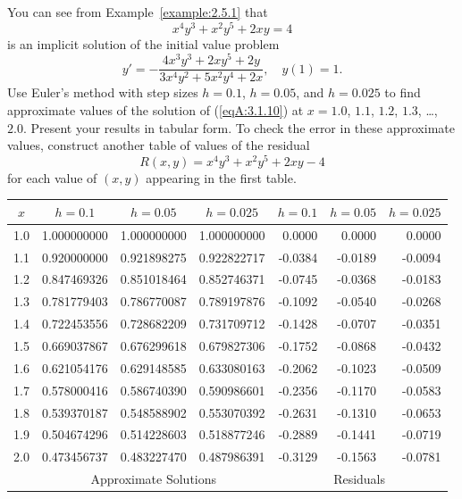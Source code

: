 \documentclass{ximera}
\begin{document}
\begin{problem}\label{exer:3.1.10} 
You can see from Example~\ref{example:2.5.1} that
$$
x^4y^3+x^2y^5+2xy=4
$$
is an implicit solution of the initial value problem
\begin{equation}\label{eqA:3.1.10}
y'=-\frac{4x^3y^3+2xy^5+2y}{3x^4y^2+5x^2y^4+2x},\quad y(1)=1.
\end{equation}
Use Euler's method with step sizes $h=0.1$, $h=0.05$, and $h=0.025$ to
find approximate values of the solution of (\ref{eqA:3.1.10}) at
$x=1.0$, $1.1$, $1.2$, $1.3$, \dots, $2.0$. Present your results in tabular form.
To check the error in these approximate values, construct another
table of values of the residual
$$
R(x,y)=x^4y^3+x^2y^5+2xy-4
$$
for each value of $(x,y)$ appearing in the first table.



\begin{solution}
    {\small
\begin{tabular}{|c|r|r|r|r|r|r|}\hline
\multicolumn{1}{|c|}{$x$}&
\multicolumn{1}{|c|}{$h=0.1$}&
\multicolumn{1}{|c|}{$h=0.05$}&
\multicolumn{1}{|c|}{$h=0.025$}&
\multicolumn{1}{|c|}{$h=0.1$}&
\multicolumn{1}{|c|}{$h=0.05$}&
\multicolumn{1}{|c|}{$h=0.025$}\\ \hline
1.0 & 1.000000000 & 1.000000000 & 1.000000000 & 0.0000 & 0.0000  &  0.0000  \\
1.1 & 0.920000000 & 0.921898275 & 0.922822717 &-0.0384 & -0.0189 & -0.0094  \\
1.2 & 0.847469326 & 0.851018464 & 0.852746371 &-0.0745 & -0.0368 & -0.0183  \\
1.3 & 0.781779403 & 0.786770087 & 0.789197876 &-0.1092 & -0.0540 & -0.0268  \\
1.4 & 0.722453556 & 0.728682209 & 0.731709712 &-0.1428 & -0.0707 & -0.0351  \\
1.5 & 0.669037867 & 0.676299618 & 0.679827306 &-0.1752 & -0.0868 & -0.0432  \\
1.6 & 0.621054176 & 0.629148585 & 0.633080163 &-0.2062 & -0.1023 & -0.0509  \\
1.7 & 0.578000416 & 0.586740390 & 0.590986601 &-0.2356 & -0.1170 & -0.0583  \\
1.8 & 0.539370187 & 0.548588902 & 0.553070392 &-0.2631 & -0.1310 & -0.0653  \\
1.9 & 0.504674296 & 0.514228603 & 0.518877246 &-0.2889 & -0.1441 & -0.0719  \\
2.0 & 0.473456737 & 0.483227470 & 0.487986391 &-0.3129 & -0.1563 & -0.0781 \\
\hline
&\multicolumn{3}{c|}{Approximate Solutions}&\multicolumn{3}{c|}{Residuals}\\\hline
\end{tabular}}
\end{solution}
\end{problem}
\end{document}

